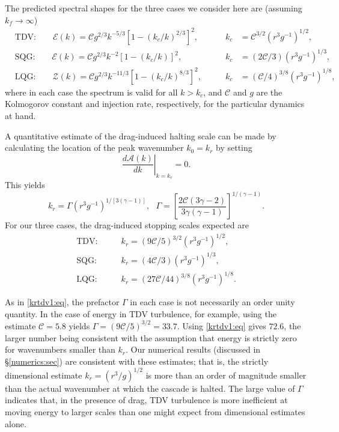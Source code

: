 \documentclass{jfm}
\newcommand{\ca}  [1]{\mathcal{#1}}
\newcommand{\dd}  [2]{\frac{d #1}{d #2}}
\begin{document}
The predicted spectral shapes for the three cases we consider here are
(assuming $k_f\rightarrow\infty$)
\begin{subequations}
\begin{alignat}{3}
&\textrm{TDV:}
\qquad \ca{E}(k) = \ca{C}g^{2/3}k^{-5/3}
\left[1-(k_c/k)^{2/3}\right]^2,
\qquad &k_c& = \ca{C}^{3/2}\left(r^3g^{-1}\right)^{1/2},
 \label{Erspec2d:eq}\\
&\textrm{SQG:}
\qquad \ca{E}(k) = \ca{C}g^{2/3}k^{-2}
\left[1-(k_c/k)\right]^2,
\qquad &k_c& = \left(2\ca{C}/3\right)
 \left(r^3g^{-1}\right)^{1/3},\label{Erspecsqg:eq}\\
&\textrm{LQG:}
\qquad \ca{Z}(k) = \ca{C}g^{2/3}k^{-11/3}
\left[1-(k_c/k)^{8/3}\right]^2,
\qquad &k_c& = \left(\ca{C}/4\right)^{3/8}
 \left(r^3g^{-1}\right)^{1/8},\label{Erspeclqg:eq}
\end{alignat}
\end{subequations}
where in each case the spectrum is valid for all $k>k_c$, and $\ca{C}$
and $g$ are the Kolmogorov constant and injection rate, respectively,
for the particular dynamics at hand.

A quantitative estimate of the drag-induced halting scale can be made
by calculating the location of the peak wavenumber $k_0 = k_r$ by
setting
\begin{equation}
\left.\dd{\ca{A}(k)}{k}\right|_{k=k_r} = 0.
\label{dAdk0:eq}
\end{equation}
This yields
\begin{equation}
k_r = \Gamma\left(r^3g^{-1}\right)^{1/[3(\gamma-1)]},~~~
\Gamma = \left[\frac{2\ca{C}(3\gamma-2)}{3\gamma(\gamma-1)}
\right]^{1/(\gamma-1)}.
\label{krAtrue:eq}
\end{equation}
For our three cases, the drag-induced stopping scales expected
are
\begin{subequations}
\begin{align}
\textrm{TDV:}
\qquad & k_r = \left(9\ca{C}/5\right)^{3/2}
\left(r^3g^{-1}\right)^{1/2},\label{kr2d:eq}\\
\textrm{SQG:}
\qquad & k_r = \left(4\ca{C}/3\right)
\left(r^3g^{-1}\right)^{1/3},\label{krsqg:eq}\\
\textrm{LQG:}
\qquad & k_r = \left(27\ca{C}/44\right)^{3/8}
\left(r^3g^{-1}\right)^{1/8}.\label{krlqg:eq}
\end{align}
\end{subequations}

As in \eqref{krtdv1:eq}, the prefactor $\Gamma$ in each case is not
necessarily an order unity quantity. In the case of energy in TDV
turbulence, for example, using the estimate $\ca{C} = 5.8$
\citep{Maltrud91} yields $\Gamma = (9\ca{C}/5)^{3/2} = 33.7$. Using
\eqref{krtdv1:eq} gives $72.6$, the larger number being consistent with the
assumption that energy is strictly zero for wavenumbers smaller than $k_r$.
Our numerical results (discussed in \S \ref{numerics:sec}) are consistent
with these estimates; that is, the strictly dimensional estimate $k_r =
(r^3/g)^{1/2}$ is more than an order of magnitude smaller than the actual
wavenumber at which the cascade is halted.  The large value of $\Gamma$
indicates that, in the presence of drag, TDV turbulence is more inefficient
at moving energy to larger scales than one might expect from dimensional
estimates alone.
\end{document}
